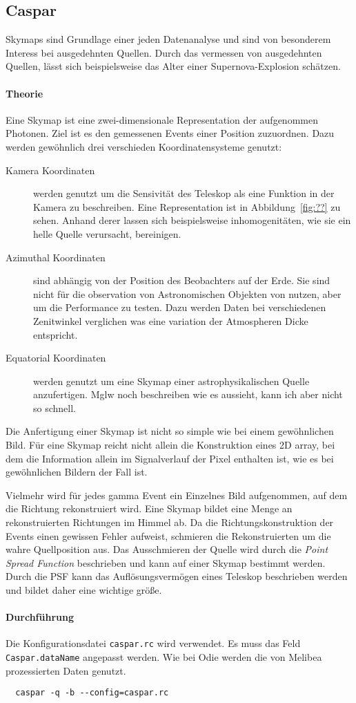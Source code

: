 \subsection{Caspar}%
\label{sub:caspar}
Skymaps sind Grundlage einer jeden Datenanalyse 
und sind von besonderem Interess bei ausgedehnten Quellen. 
Durch das vermessen von ausgedehnten Quellen, 
lässt sich beispielsweise das Alter einer Supernova-Explosion schätzen.

\paragraph{Theorie}%
\label{par:theorie}
Eine Skymap ist eine zwei-dimensionale Representation der aufgenommen Photonen.
Ziel ist es den gemessenen Events einer Position zuzuordnen. 
Dazu werden gewöhnlich drei verschieden Koordinatensysteme genutzt:
\begin{description}
	\item[\quad Kamera Koordinaten] werden genutzt um die Sensivität des Teleskop
		als eine Funktion in der Kamera zu beschreiben. 
		Eine Representation ist in Abbildung~\ref{fig:??} zu sehen. 
		Anhand derer lassen sich beispielsweise inhomogenitäten,
		wie sie ein helle Quelle verursacht,
		bereinigen.

	\item[\quad Azimuthal Koordinaten] sind abhängig von der Position des
		Beobachters auf der Erde. 
		Sie sind nicht für die observation von Astronomischen Objekten von nutzen,
		aber um die Performance zu testen.
		Dazu werden Daten bei verschiedenen Zenitwinkel verglichen was eine
		variation der Atmospheren Dicke entspricht. 

	\item[\quad Equatorial Koordinaten] werden genutzt um eine Skymap einer
		astrophysikalischen Quelle anzufertigen. 
		Mglw noch beschreiben wie es aussieht, kann ich aber nicht so schnell.
\end{description}

Die Anfertigung einer Skymap ist nicht so simple wie bei einem gewöhnlichen
Bild. 
Für eine Skymap reicht nicht allein die Konstruktion eines 2D array,
bei dem die Information allein im Signalverlauf der Pixel enthalten ist,
wie es bei gewöhnlichen Bildern der Fall ist.

Vielmehr wird für jedes gamma Event ein Einzelnes Bild aufgenommen, 
auf dem die Richtung rekonstruiert wird.
Eine Skymap bildet eine Menge an rekonstruierten Richtungen im Himmel ab. 
Da die Richtungskonstruktion der Events einen gewissen Fehler aufweist,
schmieren die Rekonstruierten um die wahre Quellposition aus. 
Das Ausschmieren der Quelle wird durch die \textit{Point Spread Function}
beschrieben 
und kann auf einer Skymap bestimmt werden. 
Durch die PSF kann das Auflösungsvermögen eines Teleskop beschrieben werden und
bildet daher eine wichtige größe.

\paragraph{Durchführung}%

Die Konfigurationsdatei \texttt{caspar.rc} wird verwendet.
Es muss das Feld \texttt{Caspar.dataName} angepasst werden.
Wie bei Odie werden die von Melibea prozessierten Daten genutzt.


\begin{lstlisting}
  caspar -q -b --config=caspar.rc
\end{lstlisting}
